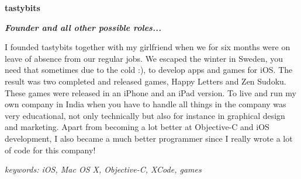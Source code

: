 \item[2010-2013] \textbf{tastybits}

\textit{\textbf{Founder and all other possible roles...}}

I founded tastybits together with my girlfriend when we for six months were on leave of absence from our regular jobs. We escaped the winter in Sweden, you need that sometimes due to the cold :), to develop apps and games for iOS. The result was two completed and released games, Happy Letters and Zen Sudoku. These games were released in an iPhone and an iPad version. To live and run my own company in India when you have to handle all things in the company was very educational, not only technically but also for instance in graphical design and marketing. Apart from becoming a lot better at Objective-C and iOS development, I also became a much better programmer since I really wrote a lot of code for this company!

\textit{keywords: iOS, Mac OS X, Objective-C, XCode, games}